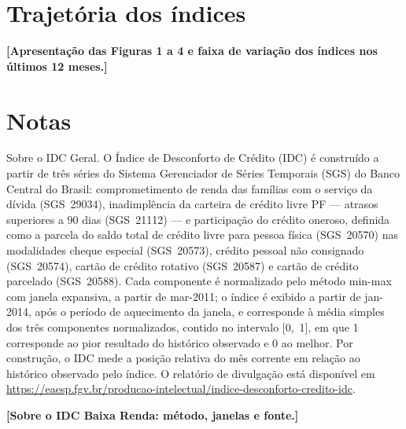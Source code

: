 \documentclass[11pt,a4paper]{article}
\newcommand{\placeholder}[1]{\textbf{[#1]}}
\newcommand{\janelainicio}{jan-2014}
\newcommand{\seriesinicio}{mar-2011}
\begin{document}
\section{Trajetória dos índices}

\placeholder{Apresentação das Figuras 1 a 4 e faixa de variação dos índices nos últimos 12 meses.}


\section*{Notas}

\begingroup\footnotesize

Sobre o IDC Geral. O Índice de Desconforto de Crédito (IDC) é construído a partir de
três séries do Sistema Gerenciador de Séries Temporais (SGS) do Banco Central do Brasil:
comprometimento de renda das famílias com o serviço da dívida (SGS~29034), inadimplência
da carteira de crédito livre PF --- atrasos superiores a 90 dias (SGS~21112) --- e
participação do crédito oneroso, definida como a parcela do saldo total de crédito
livre para pessoa física (SGS~20570) nas modalidades cheque especial (SGS~20573), crédito
pessoal não consignado (SGS~20574), cartão de crédito rotativo (SGS~20587) e cartão de
crédito parcelado (SGS~20588). Cada componente é
normalizado pelo método min-max com janela expansiva, a partir de \seriesinicio; o índice
é exibido a partir de \janelainicio, após o período de aquecimento da janela, e corresponde
à média simples dos três componentes normalizados, contido no intervalo [0,~1], em que 1 corresponde
ao pior resultado do histórico observado e 0 ao melhor. Por
construção, o IDC mede a posição relativa do mês corrente em relação ao histórico observado
pelo índice. O relatório de divulgação está disponível em
\url{https://eaesp.fgv.br/producao-intelectual/indice-desconforto-credito-idc}.

\placeholder{Sobre o IDC Baixa Renda: método, janelas e fonte.}
\end{document}
